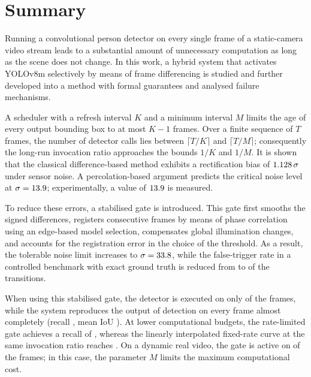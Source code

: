 \documentclass[12pt,a4paper]{article}
\theoremstyle{plain}
\theoremstyle{definition}
\begin{document}
\newpage
\section*{Summary}

Running a convolutional person detector on every single frame of a static-camera video stream leads to a substantial amount of unnecessary computation as long as the scene does not change. In this work, a hybrid system that activates YOLOv8m selectively by means of frame differencing is studied and further developed into a method with formal guarantees and analysed failure mechanisms.

A scheduler with a refresh interval $K$ and a minimum interval $M$ limits the age of every output bounding box to at most $K-1$ frames. Over a finite sequence of $T$ frames, the number of detector calls lies between $\lceil T/K\rceil$ and $\lceil T/M\rceil$; consequently the long-run invocation ratio approaches the bounds $1/K$ and $1/M$. It is shown that the classical difference-based method exhibits a rectification bias of $1.128\,\sigma$ under sensor noise. A percolation-based argument predicts the critical noise level at $\sigma=13.9$; experimentally, a value of $13.9$ is measured.

To reduce these errors, a stabilised gate is introduced. This gate first smooths the signed differences, registers consecutive frames by means of phase correlation using an edge-based model selection, compensates global illumination changes, and accounts for the registration error in the choice of the threshold. As a result, the tolerable noise limit increases to $\sigma=33.8$, while the false-trigger rate in a controlled benchmark with exact ground truth is reduced from \GateFprFD{} to \GateFprFDS{} of the transitions.

When using this stabilised gate, the detector is executed on only \PolRatioFDS{} of the frames, while the system reproduces the output of detection on every frame almost completely (recall \PolRecallFDS, mean IoU \PolIouFDS). At lower computational budgets, the rate-limited gate achieves a recall of \PolRecallFDSMFour{}, whereas the linearly interpolated fixed-rate curve at the same invocation ratio reaches \FixedRecallAtFDSMFour{}. On a dynamic real video, the gate is active on \VtActiveFDS{} of the frames; in this case, the parameter $M$ limits the maximum computational cost.
\end{document}
